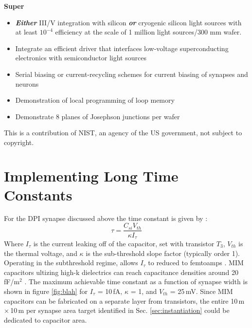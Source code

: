 \documentclass[twocolumn]{article}
\begin{document}
\textbf{Super}
\begin{itemize}
    \item \textbf{\textit{Either} }III/V integration with silicon \textbf{\textit{or}} cryogenic silicon light sources with at least $10^{-4}$ efficiency at the scale of 1 million light sources/300 mm wafer.
    \item Integrate an efficient driver that interfaces low-voltage superconducting electronics with semiconductor light sources
    \item Serial biasing or current-recycling schemes for current biasing of synapses and neurons
    \item Demonstration of local programming of loop memory
    \item Demonstrate 8 planes of Josephson junctions per wafer
    
\end{itemize}


\vspace{0.5em}
This is a contribution of NIST, an agency of the US government, not subject to copyright.
	
\newpage
\appendix

\section{Implementing Long Time Constants}
For the DPI synapse discussed above the time constant is given by \cite{chicca2014neuromorphic}:
\begin{equation}
    \tau = \frac{C_{si}V_{th}}{\kappa I_{\tau}}
\end{equation}
Where $I_{\tau}$ is the current leaking off of the capacitor, set with transistor $T_3$, $V_{th}$ is the thermal voltage, and $\kappa$ is the sub-threshold slope factor (typically order 1). Operating in the subthreshold regime, allows $I_{\tau}$ to reduced to femtoamps \cite{linares2003design}. MIM capacitors ultizing high-k dielectrics can reach capacitance densities around 20\,fF/\textmu m$^2$ \cite{}. The maximum achievable time constant as a function of synapse width is shown in figure \ref{fig:blah} for $I_{\tau}$ = 10\,fA, $\kappa$ = 1, and $V_{th}$ = 25\,mV. Since MIM capacitors can be fabricated on a separate layer from transistors, the entire 10\,\textmu m $\times$\,10\,\textmu m per synapse area target identified in Sec. \ref{sec:instantiation} could be dedicated to capacitor area.
\end{document}
